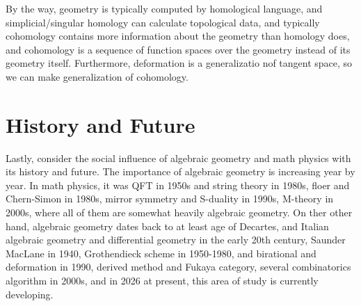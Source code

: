 \documentclass{article}
\begin{document}
By the way, geometry is typically computed by homological language, and simplicial/singular homology can calculate topological data,
and typically cohomology contains more information about the geometry than homology does, and cohomology is a sequence of function spaces
over the geometry instead of its geometry itself. Furthermore, deformation is a generalizatio nof tangent space,
so we can make generalization of cohomology. \\


\section{History and Future}

Lastly, consider the social influence of algebraic geometry and math physics with its history and future.
The importance of algebraic geometry is increasing year by year.
In math physics, it was QFT in 1950s and string theory in 1980s, floer and Chern-Simon in 1980s, mirror symmetry and S-duality in 1990s,
M-theory in 2000s, where all of them are somewhat heavily algebraic geometry.
On ther other hand, algebraic geometry dates back to at least age of Decartes, and Italian algebraic geometry and differential geometry
in the early 20th century, Saunder MacLane in 1940, Grothendieck scheme in 1950-1980, and birational and deformation in 1990,
derived method and Fukaya category, several combinatorics algorithm in 2000s,
and in 2026 at present, this area of study is currently developing.



\nocite{*}
\printbibliography
\end{document}
